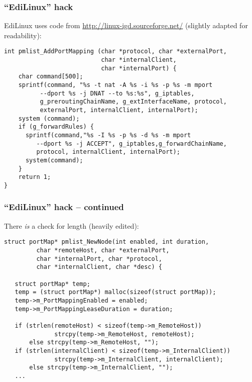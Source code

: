 \documentclass[10pt]{beamer}
\begin{document}
\begin{frame}[fragile]

\frametitle{``EdiLinux'' hack}

EdiLinux uses code from \url{http://linux-igd.sourceforge.net/}
(slightly adapted for readability):

\begin{verbatim}
int pmlist_AddPortMapping (char *protocol, char *externalPort,
                           char *internalClient,
                           char *internalPort) {
    char command[500];
    sprintf(command, "%s -t nat -A %s -i %s -p %s -m mport
          --dport %s -j DNAT --to %s:%s", g_iptables,
          g_preroutingChainName, g_extInterfaceName, protocol,
          externalPort, internalClient, internalPort);
    system (command);
    if (g_forwardRules) {
      sprintf(command,"%s -I %s -p %s -d %s -m mport
         --dport %s -j ACCEPT", g_iptables,g_forwardChainName,
         protocol, internalClient, internalPort);
      system(command);
    }
    return 1;
}
\end{verbatim}
\end{frame}

\begin{frame}[fragile]

\frametitle{``EdiLinux'' hack -- continued}

There \textit{is} a check for length (heavily edited):

\begin{verbatim}
struct portMap* pmlist_NewNode(int enabled, int duration,
         char *remoteHost, char *externalPort,
         char *internalPort, char *protocol,
         char *internalClient, char *desc) {

   struct portMap* temp;
   temp = (struct portMap*) malloc(sizeof(struct portMap));
   temp->m_PortMappingEnabled = enabled;
   temp->m_PortMappingLeaseDuration = duration;

   if (strlen(remoteHost) < sizeof(temp->m_RemoteHost))
              strcpy(temp->m_RemoteHost, remoteHost);
       else strcpy(temp->m_RemoteHost, "");
   if (strlen(internalClient) < sizeof(temp->m_InternalClient))
              strcpy(temp->m_InternalClient, internalClient);
       else strcpy(temp->m_InternalClient, "");
   ...
\end{verbatim}

\end{frame}
\end{document}

